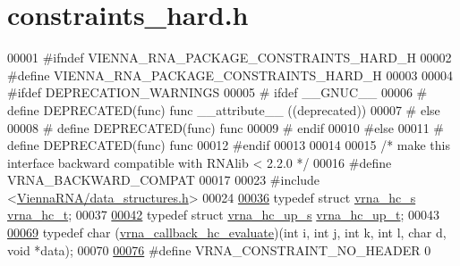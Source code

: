 \hypertarget{constraints__hard_8h_source}{}\section{constraints\+\_\+hard.\+h}
\label{constraints__hard_8h_source}

\begin{DoxyCode}
00001 \textcolor{preprocessor}{#ifndef VIENNA\_RNA\_PACKAGE\_CONSTRAINTS\_HARD\_H}
00002 \textcolor{preprocessor}{#define VIENNA\_RNA\_PACKAGE\_CONSTRAINTS\_HARD\_H}
00003 
00004 \textcolor{preprocessor}{#ifdef DEPRECATION\_WARNINGS}
00005 \textcolor{preprocessor}{# ifdef \_\_GNUC\_\_}
00006 \textcolor{preprocessor}{#  define DEPRECATED(func) func \_\_attribute\_\_ ((deprecated))}
00007 \textcolor{preprocessor}{# else}
00008 \textcolor{preprocessor}{#  define DEPRECATED(func) func}
00009 \textcolor{preprocessor}{# endif}
00010 \textcolor{preprocessor}{#else}
00011 \textcolor{preprocessor}{# define DEPRECATED(func) func}
00012 \textcolor{preprocessor}{#endif}
00013 
00014 
00015 \textcolor{comment}{/* make this interface backward compatible with RNAlib < 2.2.0 */}
00016 \textcolor{preprocessor}{#define VRNA\_BACKWARD\_COMPAT}
00017 
00023 \textcolor{preprocessor}{#include <\hyperlink{data__structures_8h}{ViennaRNA/data\_structures.h}>}
00024 
\hypertarget{constraints__hard_8h_source.tex_l00036}{}\hyperlink{group__hard__constraints_gac7e4c4f8abe3163a68110c5bff24e01d}{00036} \textcolor{keyword}{typedef} \textcolor{keyword}{struct  }\hyperlink{group__hard__constraints_structvrna__hc__s}{vrna\_hc\_s} \hyperlink{group__hard__constraints_structvrna__hc__s}{vrna\_hc\_t};
00037 
\hypertarget{constraints__hard_8h_source.tex_l00042}{}\hyperlink{group__hard__constraints_ga8cd53427a942a81c87ec526bbff32ef9}{00042} \textcolor{keyword}{typedef} \textcolor{keyword}{struct }\hyperlink{group__hard__constraints_structvrna__hc__up__s}{vrna\_hc\_up\_s} \hyperlink{group__hard__constraints_structvrna__hc__up__s}{vrna\_hc\_up\_t};
00043 
\hypertarget{constraints__hard_8h_source.tex_l00069}{}\hyperlink{group__hard__constraints_ga16eb71ac9a7a35369be2eaa9d8f8dfa0}{00069} \textcolor{keyword}{typedef} char (\hyperlink{group__hard__constraints_ga16eb71ac9a7a35369be2eaa9d8f8dfa0}{vrna\_callback\_hc\_evaluate})(\textcolor{keywordtype}{int} i, \textcolor{keywordtype}{int} j, \textcolor{keywordtype}{int} k, \textcolor{keywordtype}{int} l, \textcolor{keywordtype}{char} d, \textcolor{keywordtype}{void} 
      *data);
00070 
\hypertarget{constraints__hard_8h_source.tex_l00076}{}\hyperlink{constraints__hard_8h_a08d12a9a846ea593b7171d277c9f033f}{00076} \textcolor{preprocessor}{#define VRNA\_CONSTRAINT\_NO\_HEADER         0}

\end{DoxyCode}

